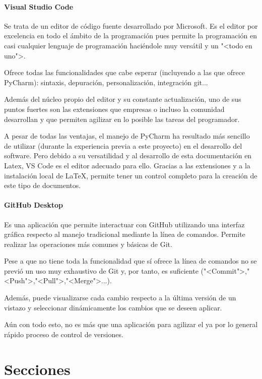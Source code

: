 \paragraph{Visual Studio Code}
Se trata de un editor de código fuente desarrollado por Microsoft. Es el editor
por excelencia en todo el ámbito de la programación pues permite la programación
en casi cualquier lenguaje de programación haciéndole muy versátil y un "<todo
en uno">.

Ofrece todas las funcionalidades que cabe esperar (incluyendo a las que ofrece
PyCharm): sintaxis, depuración, personalización, integración git...

Además del núcleo propio del editor y su constante actualización, uno de sus
puntos fuertes son las extensiones que empresas o incluso la comunidad
desarrollan y que permiten agilizar en lo posible las tareas del programador.

A pesar de todas las ventajas, el manejo de PyCharm ha resultado más sencillo de
utilizar (durante la experiencia previa a este proyecto) en el desarrollo del
software. Pero debido a su versatilidad y al desarrollo de esta
documentación en Latex, VS Code es el editor adecuado para ello. Gracias a las
extensiones y a la instalación local de \LaTeX, permite tener un control completo
para la creación de este tipo de documentos. 


\paragraph{GitHub Desktop}
Es una aplicación que permite interactuar con GitHub utilizando una interfaz
gráfica respecto al manejo tradicional mediante la línea de comandos. Permite
realizar las operaciones más comunes y básicas de Git.

Pese a que no tiene toda la funcionalidad que sí ofrece la línea de comandos no
se previó un uso muy exhaustivo de Git y, por tanto, es suficiente
("<Commit">,"<Push">,"<Pull">,"<Merge">...).

Además, puede visualizarse cada cambio respecto a la última versión de un
vistazo y seleccionar dinámicamente los cambios que se deseen aplicar.

Aún con todo esto, no es más que una aplicación para agilizar el ya por lo
general rápido proceso de control de versiones.

\section{Secciones}

